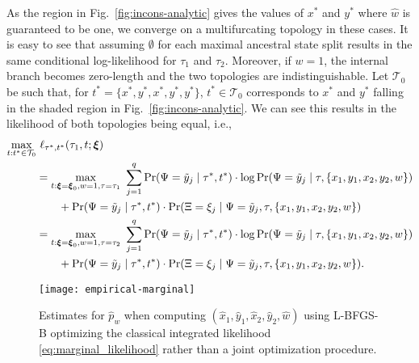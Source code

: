 As the region in Fig.~\ref{fig:incons-analytic} gives the values of $x^*$ and $y^*$ where $\hat{w}$ is guaranteed to be one, we converge on a multifurcating topology in these cases.
It is easy to see that assuming $\emptyset$ for each maximal ancestral state split results in the same conditional log-likelihood for $\tau_1$ and $\tau_2$.
Moreover, if $w=1$, the internal branch becomes zero-length and the two topologies are indistinguishable.
Let $\mathcal{T}_0$ be such that, for $t^*=\{x^*,y^*,x^*,y^*,y^*\}$, $t^*\in\mathcal{T}_0$ corresponds to $x^*$ and $y^*$ falling in the shaded region in Fig.~\ref{fig:incons-analytic}.
We can see this results in the likelihood of both topologies being equal, i.e.,
\begin{align*}
\max_{t : t^*\in\mathcal{T}_0} & \ \ell_{\tau^*,t^*}(\tau_1, t; \boldsymbol\xi)\\
&= \max_{t: \boldsymbol\xi=\boldsymbol\xi_0, w=1, \tau=\tau_1} \ \sum_{j=1}^\nSiteSplits \Pr(\siteSplitRV=\siteSplit_j \mid \tau^*, t^*) \cdot \log \Pr(\siteSplitRV=\siteSplit_j \mid \tau, \{x_1,y_1,x_2,y_2,w\})\\
&\qquad + \Pr(\siteSplitRV=\siteSplit_j \mid \tau^*, t^*) \cdot \Pr(\ancestralSplitRV=\xi_j \mid \siteSplitRV=\siteSplit_j, \tau, \{x_1,y_1,x_2,y_2,w\})\\
&= \max_{t: \boldsymbol\xi=\boldsymbol\xi_0, w=1, \tau=\tau_2} \ \sum_{j=1}^\nSiteSplits \Pr(\siteSplitRV=\siteSplit_j \mid \tau^*, t^*) \cdot \log \Pr(\siteSplitRV=\siteSplit_j \mid \tau, \{x_1,y_1,x_2,y_2,w\}) \\
&\qquad + \Pr(\siteSplitRV=\siteSplit_j \mid \tau^*, t^*) \cdot \Pr(\ancestralSplitRV=\xi_j \mid \siteSplitRV=\siteSplit_j, \tau, \{x_1,y_1,x_2,y_2,w\}).
\end{align*}



\begin{figure}
\centering
\texttt{[image: empirical-marginal]}
\caption{
    Estimates for $\hat{p}_w$ when computing $(\hat{x}_1, \hat{y}_1, \hat{x}_2, \hat{y}_2, \hat{w})$ using L-BFGS-B optimizing the classical integrated likelihood \eqref{eq:marginal_likelihood} rather than a joint optimization procedure.
}
\label{fig:bl-general-marginal}
\end{figure}
%

